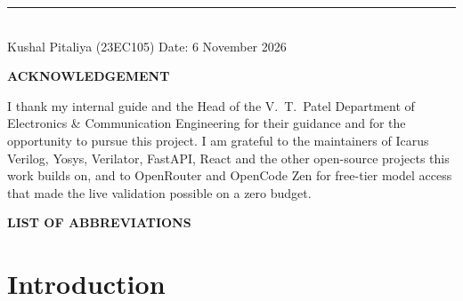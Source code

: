 \documentclass[11pt,a4paper]{article}
\begin{document}
\vspace{1.2cm}
\noindent\rule{5.5cm}{0.4pt}\\
Kushal Pitaliya (23EC105) \hfill Date: 6 November 2026

\vspace{1cm}
\begin{center}{\large\bfseries ACKNOWLEDGEMENT}\end{center}
\noindent I thank my internal guide and the Head of the V.\ T.\ Patel Department of Electronics \& Communication Engineering for their guidance and for the opportunity to pursue this project. I am grateful to the maintainers of Icarus Verilog, Yosys, Verilator, FastAPI, React and the other open-source projects this work builds on, and to OpenRouter and OpenCode Zen for free-tier model access that made the live validation possible on a zero budget.
\clearpage
\tableofcontents
\vspace{8pt}
\listoffigures
\listoftables
\vspace{6pt}
\begin{center}{\large\bfseries LIST OF ABBREVIATIONS}\end{center}
\vspace{10pt}


\section{Introduction}
\label{sec:intro}
\end{document}
